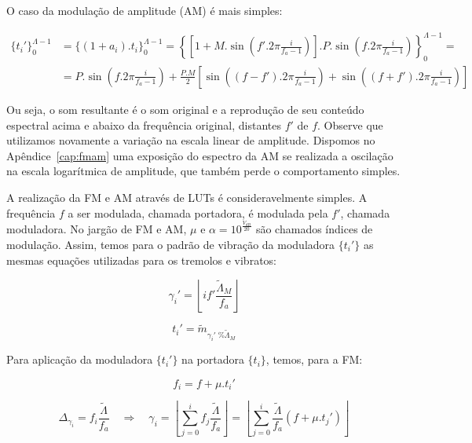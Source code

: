O caso da modulação de amplitude (AM) é mais simples:

\begin{equation}\label{eq:am}
\begin{split}
\{t_i'\}_0^{\Lambda-1} & =\{(1+a_i) . t_i\}_0^{\Lambda-1}= \left \{ \left [ 1+M.\sin \left ( f'.2\pi\frac{i}{f_a -1} \right ) \right] . P .\sin \left ( f.2\pi\frac{i}{f_a -1} \right ) \right \}_0^{\Lambda-1} = \\
& = P.\sin \left( f.2\pi\frac{i}{f_a -1}  \right ) + \frac{P.M}{2} \left [ \sin \left( (f-f').2\pi\frac{i}{f_a -1}  \right ) + \sin \left( (f+f').2\pi\frac{i}{f_a -1}  \right ) \right ]
\end{split}
\end{equation}

Ou seja, o som resultante é o som original
e a reprodução de seu conteúdo espectral acima e abaixo da frequência
original, distantes $f'$ de $f$. Observe que utilizamos novamente a variação na escala linear de amplitude. Dispomos no Apêndice~\ref{cap:fmam} uma exposição do espectro da AM se realizada a oscilação na escala logarítmica de amplitude, que também perde o comportamento simples.

A realização da FM e AM através de LUTs é consideravelmente simples.
A frequência $f$ a ser modulada, chamada portadora, é modulada pela $f'$, chamada moduladora. No jargão de FM e AM, $\mu$ e $\alpha=10^{\frac{V_{dB}}{20}}$ são chamados índices de modulação. Assim, temos
para o padrão de vibração da moduladora $\{t_i'\}$ as mesmas equações utilizadas para os tremolos e vibratos:

\begin{equation}\label{fmGamma}
\gamma_i'=\left \lfloor i f' \frac{\widetilde{\Lambda}_M}{f_a} \right \rfloor
\end{equation}

\begin{equation}\label{fmAux}
t_i'=\widetilde{m}_{\gamma_i' \;\% \widetilde{\Lambda}_M}
\end{equation}

Para aplicação da moduladora $\{t_i'\}$ na portadora $\{t_i\}$,
temos, para a FM:

\begin{equation}\label{fmF}
f_i=f + \mu . t_i'
\end{equation}

\begin{equation}\label{fmGamma}
\Delta_{\gamma_i}=f_i\frac{\widetilde{\Lambda}}{f_a} \quad \Rightarrow \quad \gamma_i = \left \lfloor \sum_{j=0}^{i} f_j \frac{\widetilde{\Lambda}}{f_a} \right \rfloor = \left \lfloor \sum_{j=0}^{i} \frac{\widetilde{\Lambda}}{f_a}(f+\mu . t_j') \right\rfloor
\end{equation}

